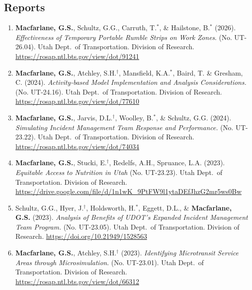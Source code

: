 \documentclass[margin,line]{res}
\newif\ifdetail{}
\newcounter{enuminitialize}
\newenvironment{myenum}[1][]
{%
 \setcounter{enuminitialize}{#1}
 \addtocounter{enuminitialize}{2}
 \begin{enumerate}[left= 4pt, itemsep=8pt, start=\value{enuminitialize}, label=\arabic*\addtocounter{enumi}{-2}]
}
{%
 \end{enumerate}
}
\begin{document}
\begin{resume}
\section{Reports}
\ifdetail These are technical reports completed under contract for the sponsoring agency;
each report was reviewed by a technical advisory committee prior to publication. Item 1 
resulted from postdoctoral activities at Georgia Tech, 
items 2 and 3 from my consulting practice, and items 4 through the present from my work 
since joining BYU.\fi
\vspace{0.3cm}
\begin{myenum}[18]
  \ifdetail{\color{NavyBlue} \fi
\item \textbf{Macfarlane, G.S.}, Schultz, G.G., Carruth, T.$^*$, \& Hailstone, B.$^*$ (2026). \textit{Effectiveness of Temporary Portable Rumble Strips on Work Zones}. (No. UT-26.04). 
  Utah Dept.\ of Transportation. Division of Research. \url{https://rosap.ntl.bts.gov/view/dot/91241}

\ifdetail } \fi
\item \textbf{Macfarlane, G.S.}, Atchley, S.H.$^\dagger$, Mansfield, K.A.$^*$, Baird, T. \& Gresham, C. (2024). 
  \textit{Activity-based Model Implementation and Analysis Considerations. }  (No. UT-24.16).  Utah Dept.\ of Transportation. Division of Research. \url{https://rosap.ntl.bts.gov/view/dot/77610}

\item \textbf{Macfarlane, G.S.},  Jarvis, D.L.$^\dagger$, Woolley, B.$^*$, \& Schultz, G.G. (2024).
  \textit{Simulating Incident Management Team Response and Performance.} (No. UT-23.22). 
  Utah Dept.\ of Transportation. Division of Research. \url{https://rosap.ntl.bts.gov/view/dot/74034}

\item \textbf{Macfarlane, G.S.}, Stucki, E.$^\dagger$, Redelfs, A.H., Spruance, L.A. (2023). 
  \textit{Equitable Access to Nutrition in Utah}  (No. UT-23.23).  Utah Dept.\ of Transportation. Division of Research. \url{https://drive.google.com/file/d/1n1wK_9PtFW9l1ytaDEfJhzG2mr5ws0Bw}

\item Schultz, G.G., Hyer, J.$^\dagger$, Holdsworth, H.$^*$, Eggett, D.L., \& \textbf{Macfarlane, G.S.} (2023).
  \textit{Analysis of Benefits of UDOT’s Expanded Incident Management Team Program.} (No. UT-23.05). 
  Utah Dept.\ of Transportation. Division of Research. \url{https://doi.org/10.21949/1528563} 

  \item  \textbf{Macfarlane, G.S.}, Atchley, S.H.$^\dagger$ (2023).
  \textit{Identifying Microtransit Service Areas through Microsimulation}. 
  (No. UT-23.01). Utah Dept.\ of Transportation. Division of Research.
  \url{https://rosap.ntl.bts.gov/view/dot/66312}


\end{myenum}
\end{resume}
\end{document}
